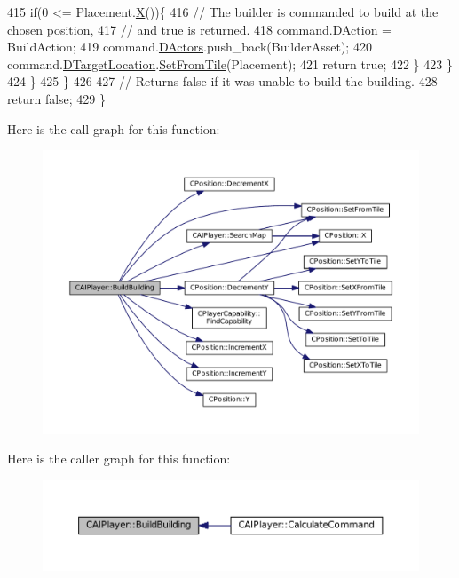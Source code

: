 \begin{DoxyCode}
415                 \textcolor{keywordflow}{if}(0 <= Placement.\hyperlink{classCPosition_a9a6b94d3b91df1492d166d9964c865fc}{X}())\{
416                     \textcolor{comment}{// The builder is commanded to build at the chosen position,}
417                     \textcolor{comment}{// and true is returned.}
418                     command.\hyperlink{structSPlayerCommandRequest_a80897bbccf2c4e0b148a7aa815a926c6}{DAction} = BuildAction;
419                     command.\hyperlink{structSPlayerCommandRequest_aa37fc01519676345703d78b9f573894a}{DActors}.push\_back(BuilderAsset);
420                     command.\hyperlink{structSPlayerCommandRequest_a701702b94ca2fd2738e95ef6711dd41a}{DTargetLocation}.\hyperlink{classCPosition_a46994e6a8b8e3b4237edd7259ad844b6}{SetFromTile}(Placement);
421                     \textcolor{keywordflow}{return} \textcolor{keyword}{true};
422                 \}
423             \}
424         \}
425     \}
426 
427     \textcolor{comment}{// Returns false if it was unable to build the building.}
428     \textcolor{keywordflow}{return} \textcolor{keyword}{false};
429 \}
\end{DoxyCode}
Here is the call graph for this function\+:\nopagebreak
\begin{figure}[H]
\begin{center}
\leavevmode
\includegraphics[width=350pt]{classCAIPlayer_a2ff5263cbaa6bfc62ffec4dbce87ba88_cgraph}
\end{center}
\end{figure}
Here is the caller graph for this function\+:\nopagebreak
\begin{figure}[H]
\begin{center}
\leavevmode
\includegraphics[width=350pt]{classCAIPlayer_a2ff5263cbaa6bfc62ffec4dbce87ba88_icgraph}
\end{center}
\end{figure}
